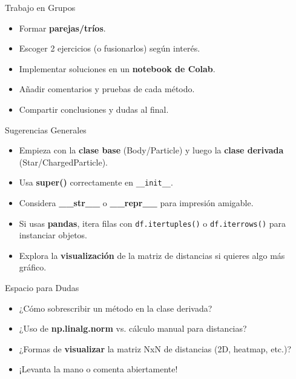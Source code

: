 \documentclass[10pt]{beamer}
\begin{document}
\begin{frame}{Trabajo en Grupos}
  \begin{itemize}
    \item Formar \textbf{parejas/tríos}.
    \item Escoger 2 ejercicios (o fusionarlos) según interés.
    \item Implementar soluciones en un \textbf{notebook de Colab}.
    \item Añadir comentarios y pruebas de cada método.
    \item Compartir conclusiones y dudas al final.
  \end{itemize}
\end{frame}

\begin{frame}{Sugerencias Generales}
  \begin{itemize}
    \item Empieza con la \textbf{clase base} (Body/Particle) y luego la \textbf{clase derivada} (Star/ChargedParticle).
    \item Usa \textbf{super()} correctamente en \texttt{\_\_init\_\_}.
    \item Considera \textbf{\_\_str\_\_} o \textbf{\_\_repr\_\_} para impresión amigable.
    \item Si usas \textbf{pandas}, itera filas con \texttt{df.itertuples()} o \texttt{df.iterrows()} para instanciar objetos.
    \item Explora la \textbf{visualización} de la matriz de distancias si quieres algo más gráfico.
  \end{itemize}
\end{frame}

\begin{frame}{Espacio para Dudas}
  \begin{itemize}
    \item ¿Cómo sobrescribir un método en la clase derivada?
    \item ¿Uso de \textbf{np.linalg.norm} vs. cálculo manual para distancias?
    \item ¿Formas de \textbf{visualizar} la matriz NxN de distancias (2D, heatmap, etc.)?
    \item ¡Levanta la mano o comenta abiertamente!
  \end{itemize}
\end{frame}
\end{document}

